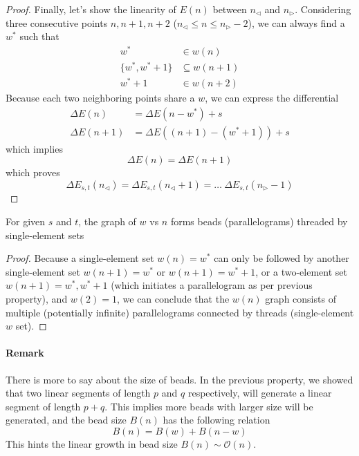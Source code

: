 \documentclass[]{article}
\begin{document}
\begin{proof}
	Finally, let's show the linearity of $E(n)$ between $n_{\triangleleft}$ and $n_{\triangleright}$. Considering three consecutive points $n, n+1, n+2$ ($n_{\triangleleft} \le n \le n_{\triangleright} - 2$), we can always find a $w^*$ such that
	\begin{align*}
	w^* &\in w(n)\\
	\{w^*, w^*+1\} &\subseteq w(n+1)\\
	w^*+1 &\in w(n+2)
	\end{align*}
	Because each two neighboring points share a $w$, we can express the differential
	\begin{align*}
	\Delta E(n) &= \Delta E(n - w^*) + s\\
	\Delta E(n+1) &= \Delta E((n+1) - (w^*+1)) + s
	\end{align*}
	which implies
	\[
	\Delta E(n) = \Delta E(n+1)
	\]
	which proves 
	\[
	\Delta E_{s,t}(n_{\triangleleft}) = \Delta E_{s,t}(n_{\triangleleft} + 1) = \dots \ \Delta E_{s,t}(n_{\triangleright} - 1)
	\]
		
\end{proof}

\vspace{1cm}
\begin{lemma}[Beads]
	For given $s$ and $t$, the graph of $w$ vs $n$ forms beads (parallelograms) threaded by single-element sets
\end{lemma}
\begin{proof}
	Because a single-element set $w(n) = {w^*}$ can only be followed by another single-element set $w(n+1) = {w^*}$ or $w(n+1)={w^*+1}$, or a two-element set $w(n+1) = {w^*, w^*+1}$ (which initiates a parallelogram as per previous property), and $w(2) = {1}$, we can conclude that the $w(n)$ graph consists of multiple (potentially infinite) parallelograms connected by threads (single-element $w$ set). 
\end{proof}

\paragraph{Remark}
There is more to say about the size of beads. In the previous property, we showed that two linear segments of length $p$ and $q$ respectively, will generate a linear segment of length $p + q$. This implies more beads with larger size will be generated, and the bead size $B(n)$ has the following relation
\[
	B(n) = B(w) + B(n-w)
\]
This hints the linear growth in bead size $B(n) \sim \mathcal{O}(n)$.
\end{document}
